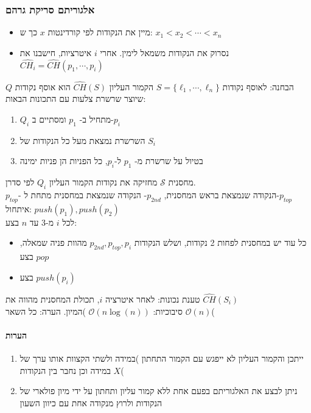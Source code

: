 \documentclass{article}
\makeatletter
\newcommand*{\saved@uline}{}
\let\saved@uline\uline
\newcommand*{\mathuline}{%
  \mathpalette{\math@uline\saved@uline}%
}
\newcommand*{\math@uline}[3]{%
  \mbox{#1{$#2#3\m@th$}}%
}
\renewcommand*{\uline}{%
  \relax  
  \ifmmode
    \expandafter\mathuline
  \else
    \expandafter\saved@uline
  \fi
}
\makeatother
\begin{document}
\subsubsection{אלגוריתם סריקת גרהם}
\begin{itemize}
\item מיין את הנקודות לפי קורדינטות  $x$ כך ש: $x_1 < x_2 < \cdots < x_n$
\item נסרוק את הנקודות משמאל לימין. אחרי $i$ איטרציות, חישבנו את $\hat{CH_i}= \hat{CH}(p_1, \cdots, p_i)$
\end{itemize}
\uline{הבחנה:} לאוסף נקודות $S=\{\ell_1, \cdots, \ell_n \}$ הקמור העליון $\hat{CH}(S)$ הוא אוסף נקודות $Q$ שיוצר שרשרת צלעות עם התכונות הבאות:
\begin{enumerate}
\item $Q_i$ מתחיל ב- $p_1$ ומסתיים ב-$p_i$
\item השרשרת נמצאת מעל כל הנקודות של $S_i$
\item בטיול על שרשרת מ- $p_1$ ל-$p_i$, כל הפניות הן פניות ימינה
\end{enumerate}
מחסנית $\mathcal{S}$ מחזיקה את נקודות הקמור העליון $Q_i$ לפי סדרן.\\ $p_{top}$- הנקודה שנמצאת בראש המחסנית, $p_{2nd}$- הנקודה שנמצאת במחסנית מתחת ל-$p_{top}$\\
\uline{איתחול:} $push(p_1), push(p_2)$\\
\uline{לכל $i$ מ-3 עד $n$ בצע:}
\begin{itemize}
\item 
כל עוד יש במחסנית לפחות 2 נקודות, ושלש הנקודות $p_{2nd}, p_{top}, p_i$ מהוות פניה שמאלה, בצע $pop$
\item בצע $push(p_i)$
\end{itemize}
\uline{טענת נכונות:} לאחר איטרציה $i$, תכולת המחסנית מהווה את $\hat{CH}(S_i)$\\
\uline{סיבוכיות:} $\mathcal{O}(n \log(n))$ )המיון. הערה: כל השאר $\mathcal{O}(n)$(\\
\paragraph{הערות }
\begin{enumerate}
\item ייתכן והקמור העליון לא ייפגש עם הקמור התחתון )במידה ולשתי הקצוות אותו ערך של $X$ במידה וכן נחבר בין הנקודות(
\item ניתן לבצע את האלגוריתם בפעם אחת ללא קמור עליון ותחתון על ידי מיון פולארי של הנקודות ולרוץ מנקודה אחת עם כיוון השעון
\end{enumerate}
\end{document}
